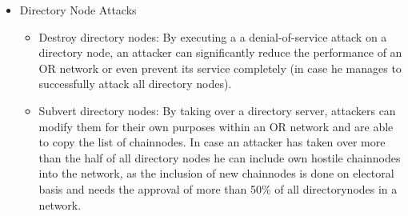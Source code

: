 \documentclass{sig-alternate}
\begin{document}
\begin{description}
\begin{itemize}
\begin{itemize}
		\end{itemize}
		\item Directory Node Attacks
			\begin{itemize} \itemsep0pt 
			\item Destroy directory nodes: By executing a a denial-of-service attack on a directory node, an attacker can significantly reduce the performance of an OR network or even prevent its service completely (in case he manages to successfully attack all directory nodes).
			\item Subvert directory nodes: By taking over a directory server, attackers can modify them for their own purposes within an OR network and are able to copy the list of chainnodes. In case an attacker has taken over more than the half of all directory nodes he can include own hostile chainnodes into the network, as the inclusion of new chainnodes is done on electoral basis and needs the approval of more than 50\% of all directorynodes in a network.
		\end{itemize}
	\end{itemize}
\end{description}
\end{document}
